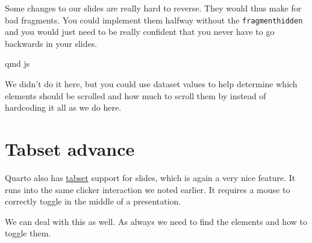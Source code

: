 \documentclass[
  letterpaper,
  DIV=11,
  numbers=noendperiod]{scrreprt}
\begin{document}
\begin{tcolorbox}[enhanced jigsaw, titlerule=0mm, bottomrule=.15mm, opacityback=0, colbacktitle=quarto-callout-note-color!10!white, colframe=quarto-callout-note-color-frame, coltitle=black, breakable, toprule=.15mm, colback=white, bottomtitle=1mm, title=\textcolor{quarto-callout-note-color}{\faInfo}\hspace{0.5em}{Note}, toptitle=1mm, arc=.35mm, left=2mm, leftrule=.75mm, rightrule=.15mm, opacitybacktitle=0.6]

Some changes to our slides are really hard to reverse. They would thus
make for bad fragments. You could implement them halfway without the
\texttt{fragmenthidden} and you would just need to be really confident
that you never have to go backwards in your slides.

\end{tcolorbox}

qmd js

\begin{tcolorbox}[enhanced jigsaw, titlerule=0mm, bottomrule=.15mm, opacityback=0, colbacktitle=quarto-callout-tip-color!10!white, colframe=quarto-callout-tip-color-frame, coltitle=black, breakable, toprule=.15mm, colback=white, bottomtitle=1mm, title=\textcolor{quarto-callout-tip-color}{\faLightbulb}\hspace{0.5em}{Tip}, toptitle=1mm, arc=.35mm, left=2mm, leftrule=.75mm, rightrule=.15mm, opacitybacktitle=0.6]

We didn't do it here, but you could use dataset values to help determine
which elements should be scrolled and how much to scroll them by instead
of hardcoding it all as we do here.

\end{tcolorbox}

\section{Tabset advance}\label{tabset-advance}

Quarto also has
\href{https://quarto.org/docs/presentations/revealjs/index.html\#tabsets}{tabset}
support for slides, which is again a very nice feature. It runs into the
same clicker interaction we noted earlier. It requires a mouse to
correctly toggle in the middle of a presentation.

We can deal with this as well. As always we need to find the elements
and how to toggle them.
\end{document}
